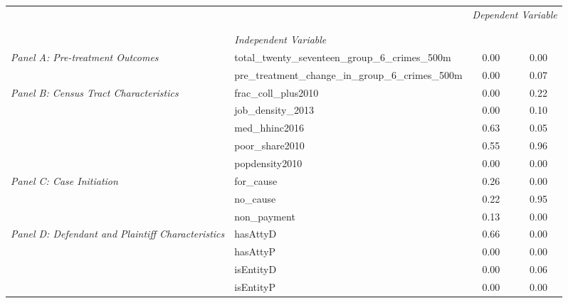 \begin{tabular}{llcc}
\toprule
 &  & \multicolumn{2}{c}{\textit{Dependent Variable}} \\
\cline{3-4}
\\
 &  &  &  \\
 & \emph{Independent Variable} &  &  \\
\midrule
\multirow[c]{2}{3cm}{\textit{Panel A: Pre-treatment Outcomes}} & total_twenty_seventeen_group_6_crimes_500m & 0.00 & 0.00 \\
 & pre_treatment_change_in_group_6_crimes_500m & 0.00 & 0.07 \\
\cline{1-4}
\multirow[c]{5}{3cm}{\textit{Panel B: Census Tract Characteristics}} & frac_coll_plus2010 & 0.00 & 0.22 \\
 & job_density_2013 & 0.00 & 0.10 \\
 & med_hhinc2016 & 0.63 & 0.05 \\
 & poor_share2010 & 0.55 & 0.96 \\
 & popdensity2010 & 0.00 & 0.00 \\
\cline{1-4}
\multirow[c]{3}{3cm}{\textit{Panel C: Case Initiation}} & for_cause & 0.26 & 0.00 \\
 & no_cause & 0.22 & 0.95 \\
 & non_payment & 0.13 & 0.00 \\
\cline{1-4}
\multirow[c]{4}{3cm}{\textit{Panel D: Defendant and Plaintiff Characteristics}} & hasAttyD & 0.66 & 0.00 \\
 & hasAttyP & 0.00 & 0.00 \\
 & isEntityD & 0.00 & 0.06 \\
 & isEntityP & 0.00 & 0.00 \\
\cline{1-4}
\bottomrule
\end{tabular}

